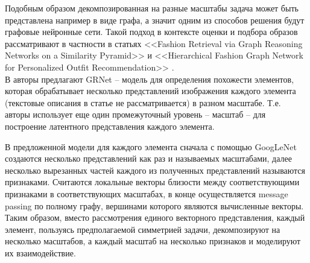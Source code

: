 \documentclass[a4paper,12pt]{article}
\begin{document}
				Подобным образом декомпозированная на разные масштабы задача может быть представлена например в виде графа, а значит одним из способов решения будут графовые нейронные сети. Такой подход в контексте оценки и подбора образов рассматривают в частности в статьях <<Fashion Retrieval via Graph Reasoning Networks on a Similarity
				Pyramid>> \cite{https://doi.org/10.48550/arXiv.1908.11754} и <<Hierarchical Fashion Graph Network for Personalized Outfit
				Recommendation>> \cite{https://doi.org/10.48550/arXiv.2005.12566}. \\
				
				В \cite{https://doi.org/10.48550/arXiv.1908.11754} авторы предлагают GRNet – модель для определения похожести элементов, которая обрабатывает несколько представлений изображения каждого элемента (текстовые описания в статье не рассматривается) в разном масштабе. Т.е. авторы использует еще один промежуточный уровень -- масштаб -- для построение латентного представления каждого элемента. 
				
				В предложенной модели для каждого элемента сначала с помощью GoogLeNet \cite{https://doi.org/10.48550/arXiv.1409.4842} создаются несколько представлений как раз и называемых масштабами, далее несколько вырезанных частей каждого из полученных представлений называются признаками. Считаются локальные векторы близости между соответствующими признаками в соответствующих масштабах, в конце осуществляется message passing \cite{https://doi.org/10.48550/arXiv.1704.01212} по полному графу, вершинами которого являются вычисленные векторы. Таким образом, вместо рассмотрения единого векторного представления, каждый элемент, пользуясь предполагаемой симметрией задачи, декомпозируют на несколько масштабов, а каждый масштаб на несколько признаков и моделируют их взаимодействие.
				
\end{document}

